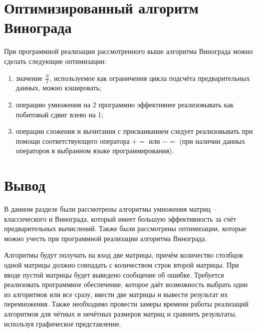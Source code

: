 \section{Оптимизированный алгоритм Винограда}

При программной реализации рассмотренного выше алгоритма Винограда можно сделать следующие оптимизации:
\begin{enumerate}
	\item значение $\frac{N}{2}$, используемое как ограничения цикла подсчёта предварительных данных, можно кэшировать;
	\item операцию умножения на 2 программно эффективнее реализовывать как побитовый сдвиг влево на 1;
	\item операции сложения и вычитания с присваиванием следует реализовывать при помощи соответствующего оператора $+=$ или $-=$ (при наличии данных операторов в выбранном языке программирования).
\end{enumerate}

\section*{Вывод}
В данном разделе были рассмотрены алгоритмы умножения матриц – классического и Винограда, который имеет большую эффективность за счёт предварительных вычислений. Также были рассмотрены оптимизации, которые можно учесть при программной реализации алгоритма Винограда.

Алгоритмы будут получать на вход две матрицы, причём количество столбцов одной матрицы должно совпадать с количеством строк второй матрицы. При вводе пустой матрицы будет выведено сообщение об ошибке. Требуется реализовать программное обеспечение, которое даёт возможность выбрать один из алгоритмов или все сразу, ввести две матрицы и вывести результат их перемножения. Также необходимо провести замеры времени работы реализаций алгоритмов для чётных и нечётных размеров матриц и сравнить результаты, используя графическое представление.
